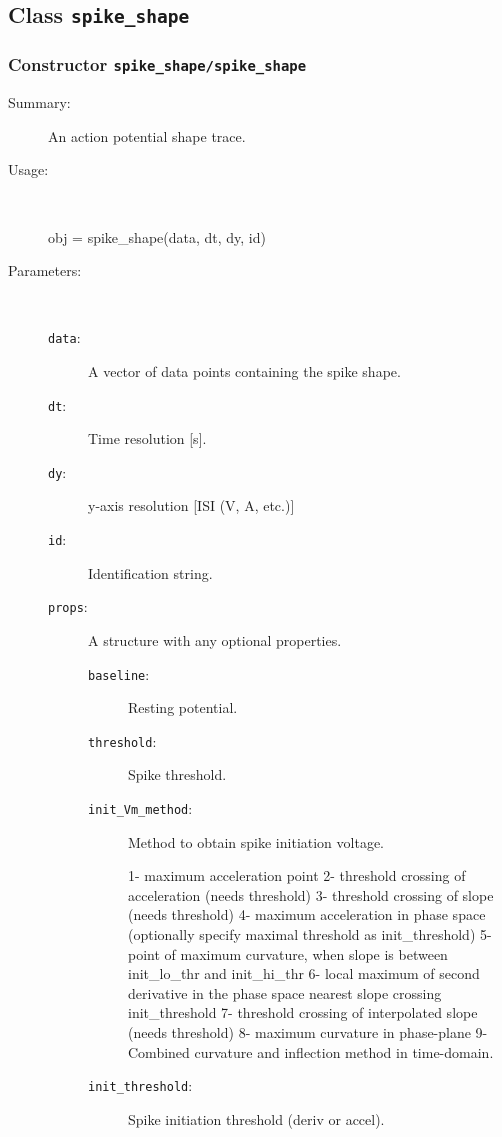 \subsection{Class \texttt{spike\_shape}}%
%
\label{ref_spike_shape}%
\hypertarget{ref_spike_shape}{}%
\subsubsection[Constructor \texttt{spike\_shape}]{Constructor \texttt{spike\_shape/spike\_shape}}%
%
\label{ref_spike_shape__spike_shape}%
\hypertarget{ref_spike_shape__spike_shape}{}%
\begin{description}
\item[Summary:]An action potential shape trace.
%
\item[Usage:]~%
\begin{lyxcode}%
obj = spike\_shape(data, dt, dy, id)
%
\end{lyxcode}%
%
%
\item[Parameters:]~
\begin{description}%
\item[\texttt{data}:]
 A vector of data points containing the spike shape.
\item[\texttt{dt}:]
 Time resolution [s].
\item[\texttt{dy}:]
 y-axis resolution [ISI (V, A, etc.)]
\item[\texttt{id}:]
 Identification string.
\item[\texttt{props}:]
 A structure with any optional properties.
\begin{description}%
\item[\texttt{baseline}:]
 Resting potential.
\item[\texttt{threshold}:]
 Spike threshold.
\item[\texttt{init\_Vm\_method}:]
 Method to obtain spike initiation voltage.

1- maximum acceleration point
2- threshold crossing of acceleration (needs threshold)
3- threshold crossing of slope (needs threshold)
4- maximum acceleration in phase space
(optionally specify maximal threshold as init\_threshold)
5- point of maximum curvature, when slope is between 
init\_lo\_thr and init\_hi\_thr
6- local maximum of second derivative in the phase space
nearest slope crossing init\_threshold
7- threshold crossing of interpolated slope (needs threshold)
8- maximum curvature in phase-plane
9- Combined curvature and inflection method in time-domain.\item[\texttt{init\_threshold}:]
 Spike initiation threshold (deriv or accel).


\end{description}
\end{description}
\end{description}
